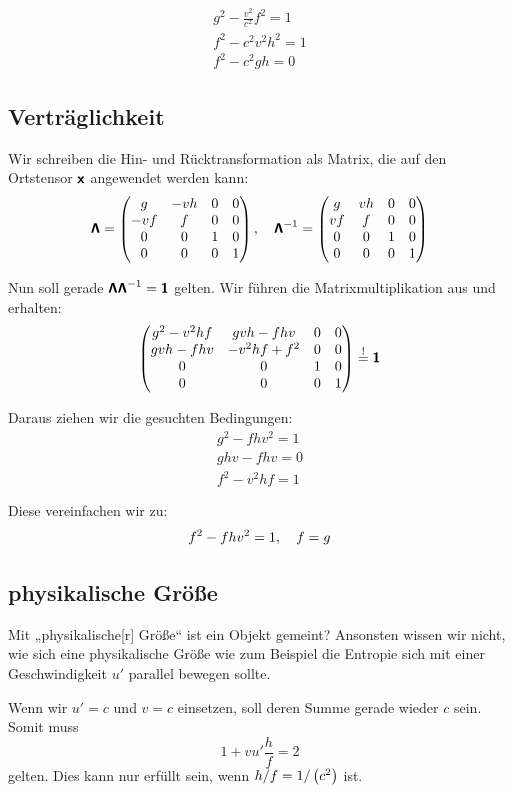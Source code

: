 \begin{gather*}
	g^2 - \frac{v^2}{c^2} f^2 = 1 \\
	f^2 - c^2v^2h^2 = 1 \\
	f^2 - c^2gh = 0
\end{gather*}

\fehlt

\subsection{Verträglichkeit}

Wir schreiben die Hin- und Rücktransformation als Matrix, die auf den
Ortstensor $\boldsymbol{\mathsf{x}}$ angewendet werden kann:
\[
	\boldsymbol{\mathsf{\Lambda}}
	=
	\begin{pmatrix}
		g & -vh & 0 & 0 \\
		-v f & f & 0 & 0 \\
		0 & 0 & 1 & 0 \\
		0 & 0 & 0 & 1
	\end{pmatrix}
	,\quad
	\boldsymbol{\mathsf{\Lambda}}^{-1}
	=
	\begin{pmatrix}
		g & vh & 0 & 0 \\
		v f & f & 0 & 0 \\
		0 & 0 & 1 & 0 \\
		0 & 0 & 0 & 1
	\end{pmatrix}
\]

Nun soll gerade $\boldsymbol{\mathsf{\Lambda}} \boldsymbol{\mathsf{\Lambda}}^{-1} = \boldsymbol{\mathsf{1}}$ gelten. Wir führen die Matrixmultiplikation aus und erhalten:
\[
	\begin{pmatrix}
		g^2 - v^2 hf & gvh - fhv & 0 & 0 \\
		gvh - fhv & -v^2hf + f^2 & 0 & 0 \\
		0 & 0 & 1 & 0 \\
		0 & 0 & 0 & 1
	\end{pmatrix}
	\overset != \boldsymbol{\mathsf{1}}
\]

Daraus ziehen wir die gesuchten Bedingungen:
\begin{gather*}
	g^2 - fhv^2 = 1 \\
	ghv - fhv = 0 \\
	f^2 - v^2 h f = 1
\end{gather*}

Diese vereinfachen wir zu:
\[
	f^2 - fhv^2 = 1
	,\quad
	f = g
\]

\subsection{physikalische Größe}

Mit „physikalische[r] Größe“ ist ein Objekt gemeint? Ansonsten wissen wir
nicht, wie sich eine physikalische Größe wie zum Beispiel die Entropie sich mit
einer Geschwindigkeit $u'$ parallel bewegen sollte.

\fehlt

Wenn wir $u' = c$ und $v = c$ einsetzen, soll deren Summe gerade wieder $c$ sein. Somit muss
\[
	1 + v u' \frac hf = 2
\]
gelten. Dies kann nur erfüllt sein, wenn $h/f = 1/\del{c^2}$ ist.

\IfFileExists{\bibliographyfile}{
	
	
}{}



